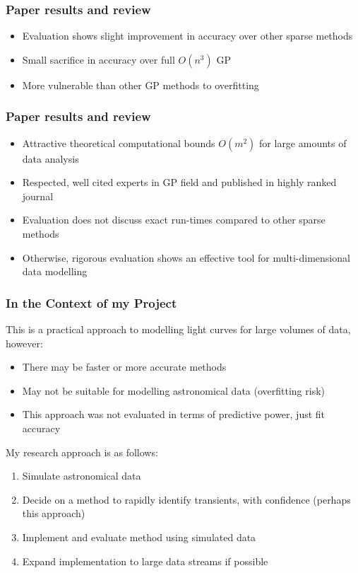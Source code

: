 \documentclass[12pt]{beamer}
\begin{document}
\begin{frame}
	\frametitle{Paper results and review}
	\begin{itemize}
		\item Evaluation shows slight improvement in accuracy over other sparse methods
		\item Small sacrifice in accuracy over full $O(n^{3})$ GP
		\item More vulnerable than other GP methods to overfitting
	\end{itemize}
	\begin{figure}
	\end{figure}
\end{frame}

\begin{frame}
  \frametitle{Paper results and review}
		\begin{itemize}
			\item Attractive theoretical computational bounds $O(m^{2})$ for large amounts of data analysis
			\item Respected, well cited experts in GP field and published in highly ranked journal
			\item Evaluation does not discuss exact run-times compared to other sparse methods
			\item Otherwise, rigorous evaluation shows an effective tool for multi-dimensional data modelling
		\end{itemize}
\end{frame}

\begin{frame}
	\frametitle{In the Context of my Project}
	This is a practical approach to modelling light curves for large volumes of data, however:
	\begin{itemize}
	  \item There may be faster or more accurate methods 
	\item May not be suitable for modelling astronomical data (overfitting risk)
	\item This approach was not evaluated in terms of predictive power, just fit accuracy
	\end{itemize}
	My research approach is as follows:
	\begin{enumerate}
	  \item Simulate astronomical data 
	  \item Decide on a method to rapidly identify transients, with confidence (perhaps this approach)
	  \item Implement and evaluate method using simulated data
	  \item Expand implementation to large data streams if possible
	\end{enumerate}
\end{frame}

	
%
\end{document}
